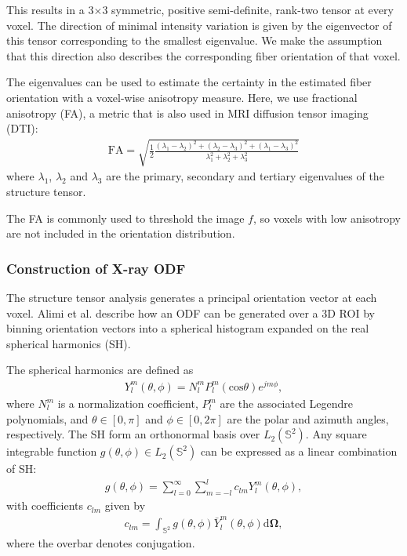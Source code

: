 \documentclass[11pt]{article}
\begin{document}
This results in a 3$\times$3 symmetric, positive semi-definite, rank-two tensor
at every voxel. The direction of minimal intensity variation is given by the
eigenvector of this tensor corresponding to the smallest eigenvalue. We make the
assumption that this direction also describes the corresponding fiber
orientation of that voxel.

The eigenvalues can be used to estimate the certainty in the estimated fiber
orientation with a voxel-wise anisotropy measure. Here, we use fractional
anisotropy (FA), a metric that is also used in MRI diffusion tensor imaging (DTI):
\begin{align}
  \label{eq:FA}
  \text{FA} = \sqrt{\frac{1}{2}\frac{(\lambda_1-\lambda_2)^2 + (\lambda_2-\lambda_3)^2 +
      (\lambda_1 - \lambda_3)^2}{\lambda_1^2 + \lambda_2^2 + \lambda_3^2}}
\end{align}
where $\lambda_1$, $\lambda_2$ and $\lambda_3$ are the primary, secondary and
tertiary eigenvalues of the structure tensor.

The FA is commonly used to threshold the image $f$, so voxels with low
anisotropy are not included in the orientation distribution.

\subsubsection{Construction of X-ray ODF}\label{alimi}
The structure tensor analysis generates a principal orientation vector at each
voxel. Alimi et al. \cite{Alimi2018} describe how an ODF can be generated over a
3D ROI by binning orientation vectors into a spherical histogram
expanded on the real spherical harmonics (SH).


The spherical harmonics are defined as
\begin{align}
  Y_l^m(\theta, \phi) = N_l^m P_l^m(\text{cos}\theta)e^{jm\phi},
\end{align}
where $N_l^m$ is a normalization coefficient, $P_l^m$ are the
associated Legendre polynomials, and $\theta \in [0, \pi]$ and $\phi \in [0, 2\pi]$
are the polar and azimuth angles, respectively. 
The SH form an orthonormal basis over $L_2(\mathbb{S}^2)$. Any
square integrable function $g(\theta, \phi) \in L_2(\mathbb{S}^2)$ can
be expressed as a linear combination of SH:
\begin{align}
  g(\theta, \phi) = \sum_{l=0}^{\infty}\sum_{m=-l}^l c_{lm}Y_l^m(\theta, \phi),
  \label{eq:SHexpand}
\end{align}
with coefficients $c_{lm}$ given by
\begin{align}
  c_{lm} = \int_{\mathbb{S}^2} g(\theta, \phi) \bar{Y}_l^m(\theta, \phi) \mathrm{d}\bm{\Omega},
  \label{eq:coeffs_0}
\end{align}
where the overbar denotes conjugation.
\end{document}
